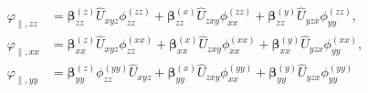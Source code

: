 \begin{align}
\varphi_{\parallel,zz}
    &=
        \bm{\beta}^{\left(z\right)}_{zz}
        \hat{U}_{xyz}
        \phi_{zz}^{\left(zz\right)}
            +
        \bm{\beta}^{\left(x\right)}_{zz}
        \hat{U}_{zxy}
        \phi_{xx}^{\left(zz\right)}
            +
        \bm{\beta}^{\left(y\right)}_{zz}
        \hat{U}_{yzx}
        \phi_{yy}^{\left(zz\right)}
,\\
\varphi_{\parallel,xx}
    &=
        \bm{\beta}^{\left(z\right)}_{xx}
        \hat{U}_{xyz}
        \phi_{zz}^{\left(xx\right)}
            +
        \bm{\beta}^{\left(x\right)}_{xx}
        \hat{U}_{zxy}
        \phi_{xx}^{\left(xx\right)}
            +
        \bm{\beta}^{\left(y\right)}_{xx}
        \hat{U}_{yzx}
        \phi_{yy}^{\left(xx\right)}
,\\
\varphi_{\parallel,yy}
    &=
        \bm{\beta}^{\left(z\right)}_{yy}
        \phi_{zz}^{\left(yy\right)}
        \hat{U}_{xyz}
            +
        \bm{\beta}^{\left(x\right)}_{yy}
        \hat{U}_{zxy}
        \phi_{xx}^{\left(yy\right)}
            +
        \bm{\beta}^{\left(y\right)}_{yy}
        \hat{U}_{yzx}
        \phi_{yy}^{\left(yy\right)}
\end{align}









    


